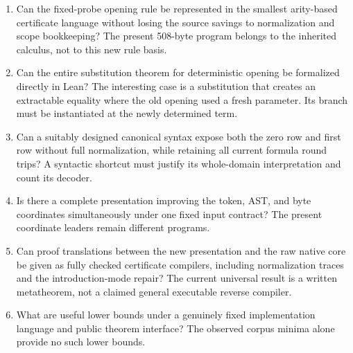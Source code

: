 \documentclass[11pt,letterpaper]{article}
\theoremstyle{definition}
\begin{document}
\begin{enumerate}
\item Can the fixed-probe opening rule be represented in the smallest
arity-based certificate language without losing the source savings to
normalization and scope bookkeeping?  The present 508-byte program belongs
to the inherited calculus, not to this new rule basis.
\item Can the entire substitution theorem for deterministic opening be
formalized directly in Lean?  The interesting case is a substitution that
creates an extractable equality where the old opening used a fresh
parameter.  Its branch must be instantiated at the newly determined term.
\item Can a suitably designed canonical syntax expose both the zero row
and first row without full normalization, while retaining all current
formula round trips?  A syntactic shortcut must justify its whole-domain
interpretation and count its decoder.
\item Is there a complete presentation improving the token, AST, and byte
coordinates simultaneously under one fixed input contract?  The present
coordinate leaders remain different programs.
\item Can proof translations between the new presentation and the raw
native core be given as fully checked certificate compilers, including
normalization traces and the introduction-mode repair?  The current
universal result is a written metatheorem, not a claimed general executable
reverse compiler.
\item What are useful lower bounds under a genuinely fixed implementation
language and public theorem interface?  The observed corpus minima alone
provide no such lower bounds.
\end{enumerate}
\end{document}
